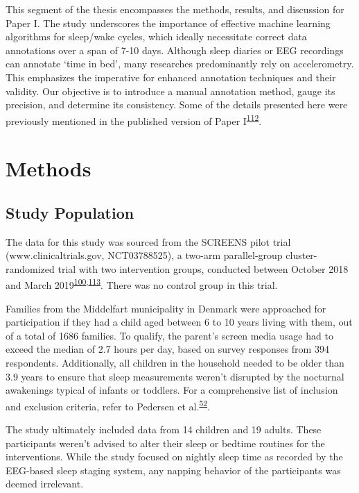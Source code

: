 \documentclass[
  10pt,
]{scrbook}
\begin{document}
This segment of the thesis encompasses the methods, results, and
discussion for Paper I. The study underscores the importance of
effective machine learning algorithms for sleep/wake cycles, which
ideally necessitate correct data annotations over a span of 7-10 days.
Although sleep diaries or EEG recordings can annotate `time in bed',
many researches predominantly rely on accelerometry. This emphasizes the
imperative for enhanced annotation techniques and their validity. Our
objective is to introduce a manual annotation method, gauge its
precision, and determine its consistency. Some of the details presented
here were previously mentioned in the published version of Paper
I\textsuperscript{\protect\hyperlink{ref-skovgaard_manual_2021}{112}}.

\hypertarget{methods}{%
\section{Methods}\label{methods}}

\hypertarget{study-population}{%
\subsection{Study Population}\label{study-population}}

The data for this study was sourced from the SCREENS pilot trial
(www.clinicaltrials.gov, NCT03788525), a two-arm parallel-group
cluster-randomized trial with two intervention groups, conducted between
October 2018 and March
2019\textsuperscript{\protect\hyperlink{ref-rasmussen_short-term_2020}{100},\protect\hyperlink{ref-rasmussen_feasibility_2021}{113}}.
There was no control group in this trial.

Families from the Middelfart municipality in Denmark were approached for
participation if they had a child aged between 6 to 10 years living with
them, out of a total of 1686 families. To qualify, the parent's screen
media usage had to exceed the median of 2.7 hours per day, based on
survey responses from 394 respondents. Additionally, all children in the
household needed to be older than 3.9 years to ensure that sleep
measurements weren't disrupted by the nocturnal awakenings typical of
infants or toddlers. For a comprehensive list of inclusion and exclusion
criteria, refer to Pedersen et
al.\textsuperscript{\protect\hyperlink{ref-pedersen_self-administered_2021}{52}}.

The study ultimately included data from 14 children and 19 adults. These
participants weren't advised to alter their sleep or bedtime routines
for the interventions. While the study focused on nightly sleep time as
recorded by the EEG-based sleep staging system, any napping behavior of
the participants was deemed irrelevant.
\end{document}
